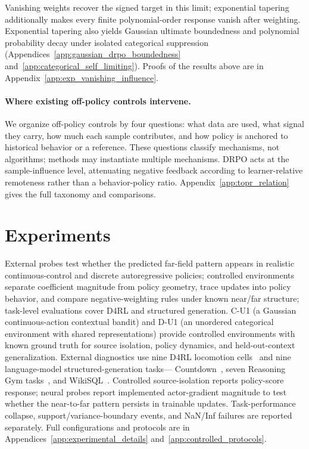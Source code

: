 \documentclass{article}
\theoremstyle{plain}
\theoremstyle{definition}
\theoremstyle{remark}
\begin{document}
Vanishing weights recover the signed target in this limit; exponential
tapering additionally makes every finite polynomial-order response vanish
after weighting.
Exponential tapering also yields Gaussian ultimate boundedness and polynomial
probability decay under isolated categorical suppression
(Appendices~\ref{app:gaussian_drpo_boundedness}
and~\ref{app:categorical_self_limiting}).
Proofs of the results above are in
Appendix~\ref{app:exp_vanishing_influence}.

\paragraph{Where existing off-policy controls intervene.}
We organize off-policy controls by four questions: what data are used, what
signal they carry, how much each sample contributes, and how policy is anchored
to historical behavior or a reference. These questions classify mechanisms,
not algorithms; methods may instantiate multiple mechanisms. DRPO acts at the
sample-influence level, attenuating negative feedback according to
learner-relative remoteness rather than a behavior-policy ratio.
Appendix~\ref{app:topr_relation} gives the full taxonomy and comparisons.

\section{Experiments}
\label{sec:experiments}

External probes test whether the predicted far-field pattern appears in
realistic continuous-control and discrete autoregressive policies; controlled
environments separate coefficient magnitude from policy geometry, trace
updates into policy behavior, and compare negative-weighting rules under known
near/far structure; task-level evaluations cover D4RL and structured
generation. C-U1 (a Gaussian continuous-action contextual bandit) and D-U1 (an
unordered categorical environment with shared representations) provide
controlled environments with known ground truth for source isolation, policy
dynamics, and held-out-context generalization. External diagnostics use nine D4RL locomotion
cells~\citep{fu2020d4rl} and nine language-model structured-generation tasks---
Countdown~\citep{hutton2002countdown,pan2025tinyzero}, seven Reasoning Gym
tasks~\citep{stojanovski2025reasoninggym}, and
WikiSQL~\citep{zhong2017seq2sql}. Controlled source-isolation reports
policy-score response; neural probes report implemented actor-gradient
magnitude to test whether the near-to-far pattern persists in trainable
updates. Task-performance collapse, support/variance-boundary events, and
NaN/Inf failures are reported separately. Full configurations and protocols
are in Appendices~\ref{app:experimental_details} and~\ref{app:controlled_protocols}.
\end{document}
